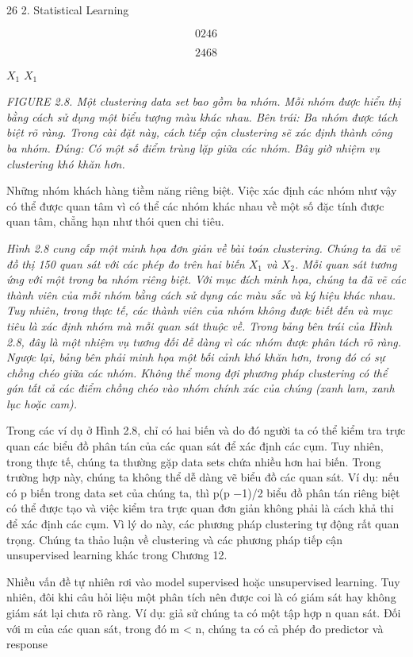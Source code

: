 26 2. Statistical Learning

\[0 2 4 6\]

\[2 4 6 8\]

$X_{1}$ $X_{1}$

\noindent\textit{FIGURE 2.8. Một clustering data set bao gồm ba nhóm. Mỗi nhóm được hiển thị bằng cách sử dụng một biểu tượng màu khác nhau. Bên trái: Ba nhóm được tách biệt rõ ràng. Trong cài đặt này, cách tiếp cận clustering sẽ xác định thành công ba nhóm. Đúng: Có một số điểm trùng lặp giữa các nhóm. Bây giờ nhiệm vụ clustering khó khăn hơn.}

Những nhóm khách hàng tiềm năng riêng biệt. Việc xác định các nhóm như vậy có thể được quan tâm vì có thể các nhóm khác nhau về một số đặc tính được quan tâm, chẳng hạn như thói quen chi tiêu.

\noindent\textit{Hình 2.8 cung cấp một minh họa đơn giản về bài toán clustering. Chúng ta đã vẽ đồ thị 150 quan sát với các phép đo trên hai biến $X_{1}$ và $X_{2}$. Mỗi quan sát tương ứng với một trong ba nhóm riêng biệt. Với mục đích minh họa, chúng ta đã vẽ các thành viên của mỗi nhóm bằng cách sử dụng các màu sắc và ký hiệu khác nhau. Tuy nhiên, trong thực tế, các thành viên của nhóm không được biết đến và mục tiêu là xác định nhóm mà mỗi quan sát thuộc về. Trong bảng bên trái của Hình 2.8, đây là một nhiệm vụ tương đối dễ dàng vì các nhóm được phân tách rõ ràng. Ngược lại, bảng bên phải minh họa một bối cảnh khó khăn hơn, trong đó có sự chồng chéo giữa các nhóm. Không thể mong đợi phương pháp clustering có thể gán tất cả các điểm chồng chéo vào nhóm chính xác của chúng (xanh lam, xanh lục hoặc cam).}

Trong các ví dụ ở Hình 2.8, chỉ có hai biến và do đó người ta có thể kiểm tra trực quan các biểu đồ phân tán của các quan sát để xác định các cụm. Tuy nhiên, trong thực tế, chúng ta thường gặp data sets chứa nhiều hơn hai biến. Trong trường hợp này, chúng ta không thể dễ dàng vẽ biểu đồ các quan sát. Ví dụ: nếu có p biến trong data set của chúng ta, thì p(p −1)/2 biểu đồ phân tán riêng biệt có thể được tạo và việc kiểm tra trực quan đơn giản không phải là cách khả thi để xác định các cụm. Vì lý do này, các phương pháp clustering tự động rất quan trọng. Chúng ta thảo luận về clustering và các phương pháp tiếp cận unsupervised learning khác trong Chương 12.

Nhiều vấn đề tự nhiên rơi vào model supervised hoặc unsupervised learning. Tuy nhiên, đôi khi câu hỏi liệu một phân tích nên được coi là có giám sát hay không giám sát lại chưa rõ ràng. Ví dụ: giả sử chúng ta có một tập hợp n quan sát. Đối với m của các quan sát, trong đó m < n, chúng ta có cả phép đo predictor và response

